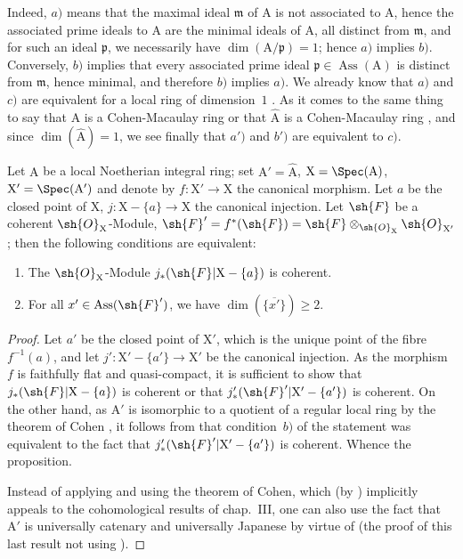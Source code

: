 
Indeed, $a)$ means that the maximal ideal $\mathfrak{m}$ of $\mathrm{A}$ is not associated to $\mathrm{A}$, hence the associated prime ideals to $\mathrm{A}$ are the minimal ideals of $\mathrm{A}$, all distinct from $\mathfrak{m}$, and for such an ideal $\mathfrak{p}$, we necessarily have $\dim(\mathrm{A}/\mathfrak{p})=1$; hence $a)$ implies $b)$.
Conversely, $b)$ implies that every associated prime ideal $\mathfrak{p}\in\operatorname{Ass}(\mathrm{A})$ is distinct from $\mathfrak{m}$, hence minimal, and therefore $b)$ implies $a)$.
We already know that $a)$ and $c)$ are equivalent for a local ring of dimension~$1$ .
As it comes to the same thing to say that $\mathrm{A}$ is a Cohen-Macaulay ring or that $\widehat{\mathrm{A}}$ is a Cohen-Macaulay ring , and since $\dim(\widehat{\mathrm{A}})=1$, we see finally that $a')$ and $b')$ are equivalent to $c)$.

\begin{proposition}[7.2.2]
\label{IV.7.2.2}
Let $\mathrm{A}$ be a local Noetherian integral ring; set $\mathrm{A}'=\widehat{\mathrm{A}}$, $\mathrm{X}=\Spec(\mathrm{A})$, $\mathrm{X}'=\Spec(\mathrm{A}')$ and denote by $f:\mathrm{X}'\to\mathrm{X}$ the canonical morphism.
Let $a$ be the closed point of $\mathrm{X}$, $j:\mathrm{X}-\{a\}\to\mathrm{X}$ the canonical injection.
Let $\sh{F}$ be a coherent $\sh{O}_\mathrm{X}$-Module, $\sh{F}'=f^*(\sh{F})=\sh{F}\otimes_{\sh{O}_\mathrm{X}}\sh{O}_{\mathrm{X}'}$; then the following conditions are equivalent:
\begin{enumerate}[label=\emph{\alph*)}]
  \item The $\sh{O}_\mathrm{X}$-Module $j_*(\sh{F}|\mathrm{X}-\{a\})$ is coherent.
  \item For all $x'\in\operatorname{Ass}(\sh{F}')$, we have $\dim(\overline{\{x'\}})\geqslant 2$.
\end{enumerate}
\end{proposition}

\begin{proof}
Let $a'$ be the closed point of $\mathrm{X}'$, which is the unique point of the fibre $f^{-1}(a)$, and let $j':\mathrm{X}'-\{a'\}\to\mathrm{X}'$ be the canonical injection.
As the morphism $f$ is faithfully flat and quasi-compact, it is sufficient to show that $j_*(\sh{F}|\mathrm{X}-\{a\})$ is coherent or that $j'_*(\sh{F}'|\mathrm{X}'-\{a'\})$ is coherent.
On the other hand, as $\mathrm{A}'$ is isomorphic to a quotient of a regular local ring by the theorem of Cohen , it follows from  that condition~$b)$ of the statement was equivalent to the fact that $j'_*(\sh{F}'|\mathrm{X}'-\{a'\})$ is coherent.
Whence the proposition.

Instead of applying  and using the theorem of Cohen, which (by ) implicitly appeals to the cohomological results of chap.~III, one can also use the fact that $\mathrm{A}'$ is universally catenary  and universally Japanese by virtue of  (the proof of this last result not using ).
\end{proof}

